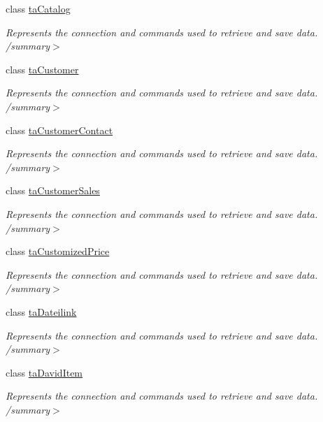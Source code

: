 \begin{DoxyCompactItemize}
class \hyperlink{class_products_1_1_data_1_1ds_sage_table_adapters_1_1ta_catalog}{ta\+Catalog}
\begin{DoxyCompactList}\small\item\em Represents the connection and commands used to retrieve and save data. /summary$>$ \end{DoxyCompactList}\item 
class \hyperlink{class_products_1_1_data_1_1ds_sage_table_adapters_1_1ta_customer}{ta\+Customer}
\begin{DoxyCompactList}\small\item\em Represents the connection and commands used to retrieve and save data. /summary$>$ \end{DoxyCompactList}\item 
class \hyperlink{class_products_1_1_data_1_1ds_sage_table_adapters_1_1ta_customer_contact}{ta\+Customer\+Contact}
\begin{DoxyCompactList}\small\item\em Represents the connection and commands used to retrieve and save data. /summary$>$ \end{DoxyCompactList}\item 
class \hyperlink{class_products_1_1_data_1_1ds_sage_table_adapters_1_1ta_customer_sales}{ta\+Customer\+Sales}
\begin{DoxyCompactList}\small\item\em Represents the connection and commands used to retrieve and save data. /summary$>$ \end{DoxyCompactList}\item 
class \hyperlink{class_products_1_1_data_1_1ds_sage_table_adapters_1_1ta_customized_price}{ta\+Customized\+Price}
\begin{DoxyCompactList}\small\item\em Represents the connection and commands used to retrieve and save data. /summary$>$ \end{DoxyCompactList}\item 
class \hyperlink{class_products_1_1_data_1_1ds_sage_table_adapters_1_1ta_dateilink}{ta\+Dateilink}
\begin{DoxyCompactList}\small\item\em Represents the connection and commands used to retrieve and save data. /summary$>$ \end{DoxyCompactList}\item 
class \hyperlink{class_products_1_1_data_1_1ds_sage_table_adapters_1_1ta_david_item}{ta\+David\+Item}
\begin{DoxyCompactList}\small\item\em Represents the connection and commands used to retrieve and save data. /summary$>$ \end{DoxyCompactList}\item 

\end{DoxyCompactItemize}
